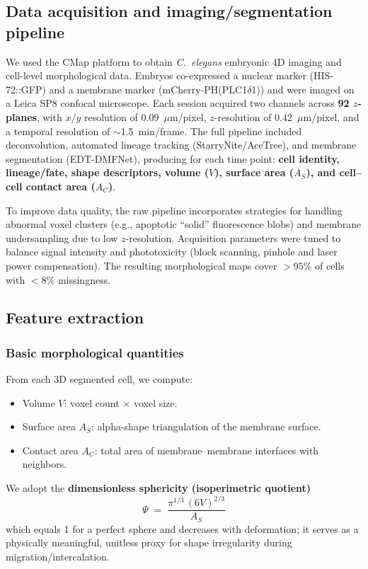\documentclass[unnumsec,webpdf,modern,large,namedate]{oup-authoring-template}%
\theoremstyle{thmstyleone}\newtheorem{theorem}{Theorem}
\theoremstyle{thmstyletwo}\newtheorem{example}{Example}
\theoremstyle{thmstylethree}\newtheorem{definition}{Definition}
\begin{document}
\subsection{Data acquisition and imaging/segmentation pipeline}
We used the CMap platform to obtain \textit{C.~elegans} embryonic 4D imaging and cell-level morphological data. Embryos co-expressed a nuclear marker (HIS-72::GFP) and a membrane marker (mCherry-PH(PLC1$\delta$1)) and were imaged on a Leica SP8 confocal microscope. Each session acquired two channels across \textbf{92 $z$-planes}, with $x/y$ resolution of 0.09~$\mu$m/pixel, $z$-resolution of 0.42~$\mu$m/pixel, and a temporal resolution of $\sim$1.5~min/frame. The full pipeline included deconvolution, automated lineage tracking (StarryNite/AceTree), and membrane segmentation (EDT-DMFNet), producing for each time point: \textbf{cell identity, lineage/fate, shape descriptors, volume ($V$), surface area ($A_S$), and cell--cell contact area ($A_C$)}.

To improve data quality, the raw pipeline incorporates strategies for handling abnormal voxel clusters (e.g., apoptotic ``solid'' fluorescence blobs) and membrane undersampling due to low $z$-resolution. Acquisition parameters were tuned to balance signal intensity and phototoxicity (block scanning, pinhole and laser power compensation). The resulting morphological maps cover $>95\%$ of cells with $<8\%$ missingness.

\subsection{Feature extraction}

\subsubsection{Basic morphological quantities}
From each 3D segmented cell, we compute:
\begin{itemize}
    \item Volume $V$: voxel count $\times$ voxel size.
    \item Surface area $A_S$: alpha-shape triangulation of the membrane surface.
    \item Contact area $A_C$: total area of membrane--membrane interfaces with neighbors.
\end{itemize}
We adopt the \textbf{dimensionless sphericity (isoperimetric quotient)}
\begin{equation}
\Psi \;=\; \frac{\pi^{1/3}\,(6V)^{2/3}}{A_S}
\label{eq:sphericity}
\end{equation}
which equals 1 for a perfect sphere and decreases with deformation; it serves as a physically meaningful, unitless proxy for shape irregularity during migration/intercalation.
\end{document}
